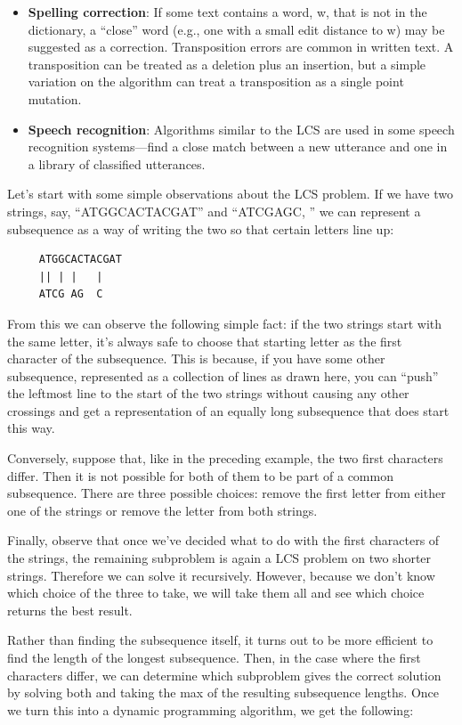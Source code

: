 \documentclass[justified, sixbynine]{tufte-book}
\theoremstyle{plain}%
\newtheorem * {corollary}{Corollary}
\theoremstyle{definition}
\theoremstyle{remark}
\newtheorem * {remark}{Remark}
\newtheorem * {note}{Note}
\begin{document}
\begin{fullwidth}
\begin{itemize}
\item  {\bf Spelling correction}: If some text contains a word, w, that is not
in the dictionary, a ``close'' word (e.g., one with a small edit distance to w)
may be suggested as a correction. Transposition errors are common in written
text. A transposition can be treated as a deletion plus an insertion, but a
simple variation on the algorithm can treat a transposition as a single
point mutation.

\item  {\bf Speech recognition}: Algorithms similar to the LCS are used in
some speech recognition systems---find a close match between a new utterance
and one in a library of classified utterances.
\end{itemize}

Let's start with some simple observations about the LCS problem. If we have
two strings, say, ``ATGGCACTACGAT'' and ``ATCGAGC, '' we can represent a
subsequence as a way of writing the two so that certain letters line up:
\begin{lstlisting}
     ATGGCACTACGAT
     || | |   |
     ATCG AG  C
\end{lstlisting}

From this we can observe the following simple fact: if the two strings start
with the same letter, it's always safe to choose that starting letter as the
first character of the subsequence. This is because, if you have some other
subsequence, represented as a collection of lines as drawn here, you can
``push'' the leftmost line to the start of the two strings without causing
any other crossings and get a representation of an equally long subsequence
that does start this way.

Conversely, suppose that, like in the preceding example, the two first
characters differ. Then it is not possible for both of them to be part of a
common subsequence.  There are three possible choices: remove the first letter from
either one of the strings or remove the letter from both strings.

Finally, observe that once we've decided what to do with the first
characters of the strings, the remaining subproblem is again a LCS problem on two shorter strings. Therefore we can solve
it recursively. However, because we don't know which choice of the three to take,
we will take them all and see which choice returns the best result.

Rather than finding the subsequence itself, it turns out to be more
efficient to find the length of the longest subsequence. Then, in
the case where the first characters differ, we can determine which
subproblem gives the correct solution by solving both and taking the max of
the resulting subsequence lengths. Once we turn this into a dynamic
programming algorithm, we get the following:


\end{fullwidth}
\end{document}

